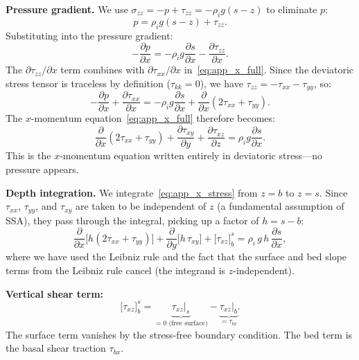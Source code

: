\documentclass[11pt]{article}
\begin{document}
\medskip
\noindent\textbf{Pressure gradient.}  We use $\sigma_{zz} = -p + \tau_{zz} = -\rho_i g(s-z)$ to eliminate $p$:
\begin{equation}
  p = \rho_i g(s - z) + \tau_{zz}.
\end{equation}
Substituting into the pressure gradient:
\begin{equation}
  -\frac{\partial p}{\partial x} = -\rho_i g \frac{\partial s}{\partial x} - \frac{\partial \tau_{zz}}{\partial x}.
\end{equation}
The $\partial \tau_{zz}/\partial x$ term combines with $\partial \tau_{xx}/\partial x$ in~\eqref{eq:app_x_full}.  Since the deviatoric stress tensor is traceless by definition ($\tau_{kk} = 0$), we have $\tau_{zz} = -\tau_{xx} - \tau_{yy}$, so:
\begin{equation}
  -\frac{\partial p}{\partial x} + \frac{\partial \tau_{xx}}{\partial x} = -\rho_i g\frac{\partial s}{\partial x} + \frac{\partial}{\partial x}(2\tau_{xx} + \tau_{yy}).
  \label{eq:app_pressure_plus_txx}
\end{equation}
The $x$-momentum equation~\eqref{eq:app_x_full} therefore becomes:
\begin{equation}
  \frac{\partial}{\partial x}(2\tau_{xx} + \tau_{yy}) + \frac{\partial \tau_{xy}}{\partial y} + \frac{\partial \tau_{xz}}{\partial z} = \rho_i g\frac{\partial s}{\partial x}.
  \label{eq:app_x_stress}
\end{equation}
This is the $x$-momentum equation written entirely in deviatoric stress---no pressure appears.

\medskip
\noindent\textbf{Depth integration.}  We integrate~\eqref{eq:app_x_stress} from $z = b$ to $z = s$.  Since $\tau_{xx}$, $\tau_{yy}$, and $\tau_{xy}$ are taken to be independent of $z$ (a fundamental assumption of SSA), they pass through the integral, picking up a factor of $h = s - b$:
\begin{equation}
  \frac{\partial}{\partial x}\!\bigl[h(2\tau_{xx} + \tau_{yy})\bigr] + \frac{\partial}{\partial y}\!\bigl[h\,\tau_{xy}\bigr] + \bigl[\tau_{xz}\bigr]_b^s = \rho_i\,g\,h\,\frac{\partial s}{\partial x},
\end{equation}
where we have used the Leibniz rule and the fact that the surface and bed slope terms from the Leibniz rule cancel (the integrand is $z$-independent).

\medskip
\noindent\textbf{Vertical shear term:}
\begin{equation}
  \bigl[\tau_{xz}\bigr]_b^s = \underbrace{\tau_{xz}\big|_s}_{= 0\text{ (free surface)}} - \underbrace{\tau_{xz}\big|_b}_{= \tau_{bx}}.
\end{equation}
The surface term vanishes by the stress-free boundary condition.  The bed term is the basal shear traction $\tau_{bx}$.
\end{document}
